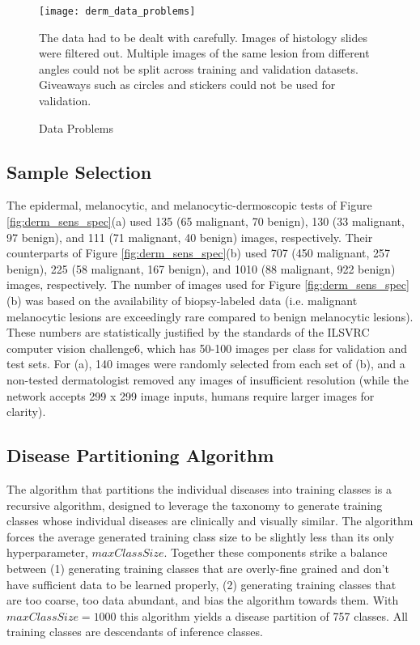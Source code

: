 \begin{figure}
\texttt{[image: derm\_data\_problems]}
\caption{Data Problems}
\vspace{12px}
The data had to be dealt with carefully.  Images of histology slides were filtered out.  Multiple images of the same lesion from different angles could not be split across training and validation datasets.  Giveaways such as circles and stickers could not be used for validation.
\label{fig:derm_data_problems}
\end{figure}

\subsection{Sample Selection}
The epidermal, melanocytic, and melanocytic-dermoscopic tests of Figure \ref{fig:derm_sens_spec}(a) used 135 (65 malignant, 70 benign), 130 (33 malignant, 97 benign), and 111 (71 malignant, 40 benign) images, respectively. Their counterparts of Figure \ref{fig:derm_sens_spec}(b) used 707 (450 malignant, 257 benign), 225 (58 malignant, 167 benign), and 1010 (88 malignant, 922 benign) images, respectively. The number of images used for Figure \ref{fig:derm_sens_spec}(b) was based on the availability of biopsy-labeled data (i.e. malignant melanocytic lesions are exceedingly rare compared to benign melanocytic lesions). These numbers are statistically justified by the standards of the ILSVRC computer vision challenge6, which has 50-100 images per class for validation and test sets. For (a), 140 images were randomly selected from each set of (b), and a non-tested dermatologist removed any images of insufficient resolution (while the network accepts 299 x 299 image inputs, humans require larger images for clarity).

\subsection{Disease Partitioning Algorithm}
The algorithm that partitions the individual diseases into training classes is a recursive algorithm, designed to leverage the taxonomy to generate training classes whose individual diseases are clinically and visually similar. The algorithm forces the average generated training class size to be slightly less than its only hyperparameter, $maxClassSize$. Together these components strike a balance between (1) generating training classes that are overly-fine grained and don’t have sufficient data to be learned properly, (2) generating training classes that are too coarse, too data abundant, and bias the algorithm towards them. With $maxClassSize = 1000$ this algorithm yields a disease partition of 757 classes. All training classes are descendants of inference classes.

